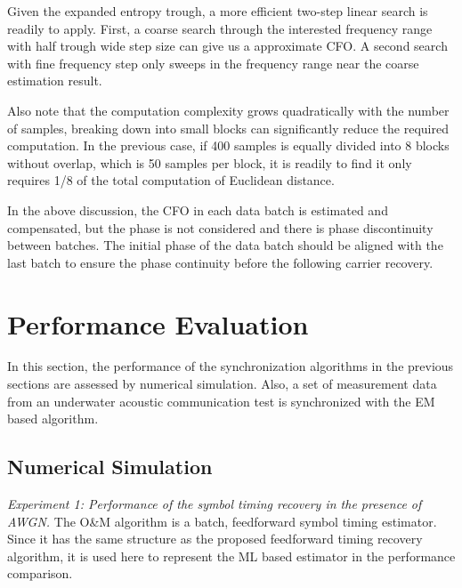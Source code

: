 \documentclass[journal,comsoc]{IEEEtran}
\begin{document}
Given the expanded entropy trough, a more efficient two-step linear search is readily to apply.
First, a coarse search through the interested frequency range with half trough wide step size can give us a approximate CFO.
A second search with fine frequency step only sweeps in the frequency range near the coarse estimation result.

Also note that the computation complexity grows quadratically with the number of samples, breaking down into small blocks can significantly reduce the required computation.
In the previous case, if 400 samples is equally divided into 8 blocks without overlap, which is 50 samples per block, it is readily to find it only requires 1/8 of the total computation of Euclidean distance. 


In the above discussion, the CFO in each data batch is estimated and compensated,
but the phase is not considered and there is phase discontinuity between batches.
The initial phase of the data batch should be aligned with the last batch to ensure the phase continuity before the following carrier recovery.

\section{Performance Evaluation}
\label{sec:performance}
In this section, the performance of the synchronization algorithms in the previous sections are assessed by numerical simulation.
Also, a set of measurement data from an underwater acoustic communication test is synchronized with the EM based algorithm.

\subsection{Numerical Simulation}
\textit{Experiment 1:
Performance of the symbol timing recovery in the presence of AWGN.}
The O\&M algorithm is a batch, feedforward symbol timing estimator.
Since it has the same structure as the proposed feedforward timing recovery algorithm, it is used here to represent the ML based estimator in the performance comparison.
\end{document}
